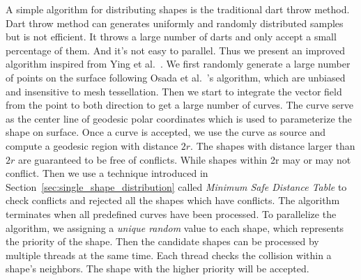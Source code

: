 A simple algorithm for distributing shapes is the traditional dart throw method. Dart throw method can generates uniformly and randomly distributed samples but is not efficient. It throws a large number of darts and only accept a small percentage of them.
And it's not easy to parallel. Thus we present an improved algorithm inspired from Ying et al.~\cite{DBLP:journals/tvcg/YingXS013}. We first randomly generate a large number of points on the surface following Osada et al.~\cite{Osada:2002:SD:571647.571648}'s algorithm, which are unbiased and insensitive to mesh tessellation. Then we start to integrate the vector field from the point to both direction to get a large number of curves. The curve serve as the center line of geodesic polar coordinates which is used to parameterize the shape on surface. Once a curve is accepted, we use the curve as source and compute a geodesic region with distance $2r$. The shapes with distance larger than $2r$ are guaranteed to be free of conflicts. While shapes within 2r may or may not conflict. Then we use a technique introduced in Section~\ref{sec:single_shape_distribution} called \textit{Minimum Safe Distance
Table} to check conflicts and rejected all the shapes which have conflicts. The algorithm terminates when all predefined curves have been processed. To parallelize the algorithm, we assigning a \textit{unique random} value to each shape, which represents the priority of the shape. Then the candidate shapes can be processed by multiple threads at the same time. Each thread checks the collision within a shape's neighbors. The shape with the higher priority will be accepted.



